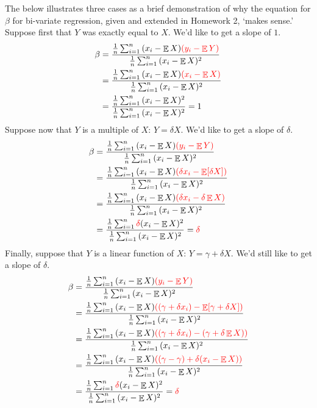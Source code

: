 \documentclass{article}
\DeclareMathOperator\E{\mathbb{E}}
\newcommand\highlight[1]{{\color{red}#1}}
\newcommand\denominator{\tfrac{1}{n}\sum_{i = 1}^{n}{(x_{i} - \E X )^{2}}}
\begin{document}
The below illustrates three cases as a brief demonstration of why the equation for \(\beta\) for bi-variate regression, given and extended in Homework 2, `makes sense.'\\

Suppose first that \(Y\) was exactly equal to \(X\). We'd like to get a slope of \(1\).
\begin{align*}
\beta &= \frac{\tfrac{1}{n}\sum_{i = 1}^{n}{(x_{i} - \E X )\highlight{(y_{i} - \E Y)}}}{\denominator}\\
&= \frac{\tfrac{1}{n}\sum_{i = 1}^{n}{(x_{i} - \E X )\highlight{(x_{i} - \E X )}}}{\denominator}\\
&= \frac{\denominator}{\denominator} = 1
\end{align*}
Suppose now that \(Y\) is a multiple of \(X\): \(Y = \delta X\). We'd like to get a slope of \(\delta\).
\begin{align*}
\beta &= \frac{\tfrac{1}{n}\sum_{i = 1}^{n}{(x_{i} - \E X)\highlight{(y_{i} - \E Y)}}}{\denominator}\\
&= \frac{\tfrac{1}{n}\sum_{i = 1}^{n}{(x_{i} - \E X)\highlight{(\delta x_{i} - \E[\delta X])}}}{\denominator}\\
&= \frac{\tfrac{1}{n}\sum_{i = 1}^{n}{(x_{i} - \E X)\highlight{(\delta x_{i} - \delta\E X)}}}{\denominator}\\
&= \frac{\tfrac{1}{n}\sum_{i = 1}^{n}{\highlight{\delta}(x_{i} - \E X)^{2}}}{\denominator} = \highlight{\delta}
\end{align*}
Finally, suppose that \(Y\) is a linear function of \(X\): \(Y = \gamma + \delta X\). We'd still like to get a slope of \(\delta\).
\begin{align*}
\beta &= \frac{\tfrac{1}{n}\sum_{i = 1}^{n}{(x_{i} - \E X)\highlight{(y_{i} - \E Y)}}}{\denominator}\\
&= \frac{\tfrac{1}{n}\sum_{i = 1}^{n}{(x_{i} - \E X)\highlight{((\gamma + \delta x_{i}) - \E[\gamma + \delta X])}}}{\denominator}\\
&= \frac{\tfrac{1}{n}\sum_{i = 1}^{n}{(x_{i} - \E X)\highlight{((\gamma + \delta x_{i}) - (\gamma + \delta \E X))}}}{\denominator}\\
&= \frac{\tfrac{1}{n}\sum_{i = 1}^{n}{(x_{i} - \E X)\highlight{((\gamma - \gamma) + \delta(x_{i} - \E X))}}}{\denominator}\\
&= \frac{\tfrac{1}{n}\sum_{i = 1}^{n}{\highlight{\delta}(x_{i} - \E X)^{2}}}{\denominator} = \highlight{\delta}
\end{align*}
\end{document}
